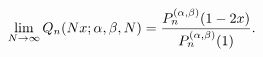 \[\lim_{N\to\infty}\mathop{Q_{n}\/}\nolimits\!\left(Nx;\alpha,\beta,N\right)=%
\frac{\mathop{P^{(\alpha,\beta)}_{n}\/}\nolimits\!\left(1-2x\right)}{\mathop{P%
^{(\alpha,\beta)}_{n}\/}\nolimits\!\left(1\right)}.\]